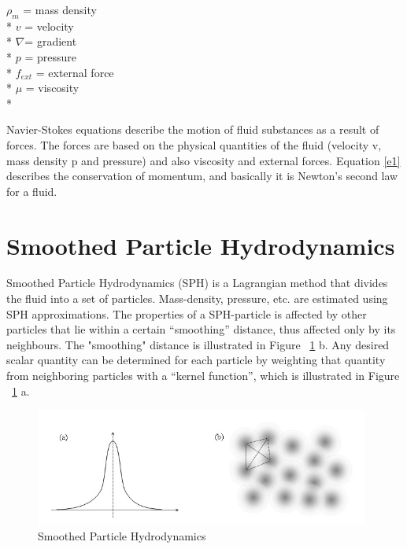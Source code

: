 \documentclass[a4paper,12pt,twoside,final]{report}
\begin{document}
\noindent$\rho_m$ = mass density\\*
$v$ = velocity\\*
$\nabla$= gradient\\*
$p$ = pressure\\*
$f_{ext}$ = external force\\*
$\mu$ = viscosity\\*

\noindent Navier-Stokes equations describe the motion of fluid substances as a result of forces. The forces are based on the physical quantities of the fluid (velocity v, mass density p and pressure) and also viscosity and external forces. Equation \ref{e1} describes the conservation of momentum, and basically it is Newton’s second law for a fluid.\\


\section{Smoothed Particle Hydrodynamics}
Smoothed Particle Hydrodynamics (SPH) is a Lagrangian method that divides the fluid into a set of particles. Mass-density, pressure, etc. are estimated using SPH approximations. The properties of a SPH-particle is affected by other particles that lie within a certain “smoothing” distance, thus affected only by its neighbours. The "smoothing" distance is illustrated in Figure ~\ref{fig:sph} b. Any desired scalar quantity can be determined for each particle by weighting that quantity from neighboring particles with a “kernel function”, which is illustrated in Figure ~\ref{fig:sph} a. \\

\begin{figure}[h]
\begin{center}
    \includegraphics[width=11cm]{figs/sph.jpg} 
\end{center}
\caption{Smoothed Particle Hydrodynamics}
\label{fig:sph}
\end{figure}
\end{document}
